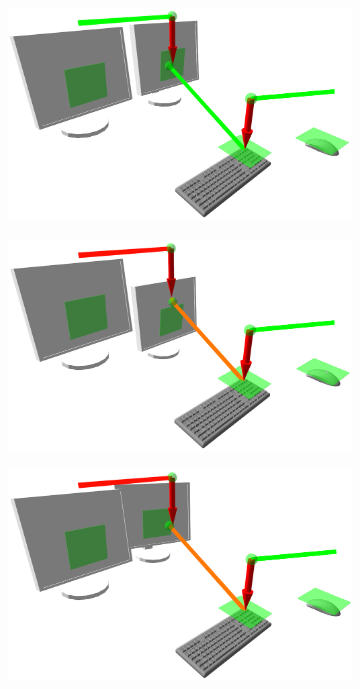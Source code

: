 \begin{figure}
 \begin{center}
  \begin{subfigure}[b]{.3\textwidth}
    \includegraphics[width=1\linewidth]{bilder/paper_fotos/s1.png}
  \end{subfigure}
  \begin{subfigure}[b]{.3\textwidth}
    \includegraphics[width=1\linewidth]{bilder/paper_fotos/s2.png}
  \end{subfigure}
  \begin{subfigure}[b]{.3\textwidth}
    \includegraphics[width=1\linewidth]{bilder/paper_fotos/s3.png}

\end{subfigure}
\end{center}
\end{figure}
